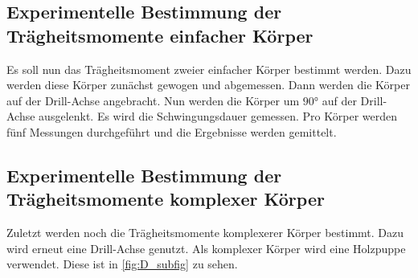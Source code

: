 \subsection{Experimentelle Bestimmung der Trägheitsmomente einfacher Körper}
\label{subsec:D_Körper}
Es soll nun das Trägheitsmoment zweier einfacher Körper bestimmt werden. Dazu werden diese Körper zunächst gewogen und abgemessen. Dann werden die Körper auf der Drill-Achse angebracht. Nun werden
die Körper um $90\unit{\degree}$ auf der Drill-Achse ausgelenkt. Es wird die Schwingungsdauer gemessen. Pro Körper werden fünf Messungen durchgeführt und die Ergebnisse werden gemittelt.
\subsection{Experimentelle Bestimmung der Trägheitsmomente komplexer Körper}
\label{subsec:D_Figur}
Zuletzt werden noch die Trägheitsmomente komplexerer Körper bestimmt. Dazu wird erneut eine Drill-Achse genutzt. Als komplexer Körper wird eine Holzpuppe verwendet. Diese ist in \autoref{fig:D_subfig} zu sehen.

